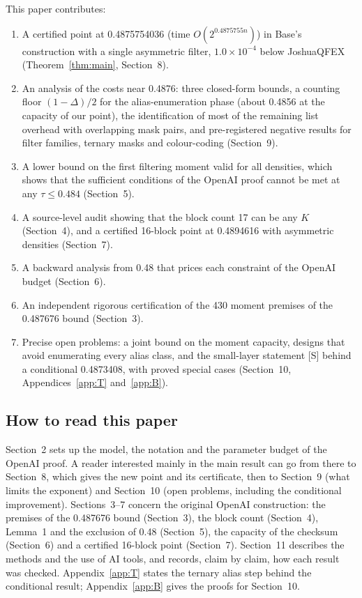 \documentclass[11pt]{article}
\theoremstyle{plain}
\begin{document}
This paper contributes:

\begin{enumerate}
\item A certified point at 0.4875754036 (time $O(2^{0.4875755n})$) in Base's construction with a single asymmetric filter, $1.0\times10^{-4}$ below JoshuaQFEX (Theorem~\ref{thm:main}, Section~8).
\item An analysis of the costs near 0.4876: three closed-form bounds, a counting floor $(1 - \Delta)/2$ for the alias-enumeration phase (about 0.4856 at the capacity of our point), the identification of most of the remaining list overhead with overlapping mask pairs, and pre-registered negative results for filter families, ternary masks and colour-coding (Section~9).
\item A lower bound on the first filtering moment valid for all densities, which shows that the sufficient conditions of the OpenAI proof cannot be met at any $\tau \le 0.484$ (Section~5).
\item A source-level audit showing that the block count 17 can be any $K$ (Section~4), and a certified 16-block point at 0.4894616 with asymmetric densities (Section~7).
\item A backward analysis from 0.48 that prices each constraint of the OpenAI budget (Section~6).
\item An independent rigorous certification of the 430 moment premises of the 0.487676 bound (Section~3).
\item Precise open problems: a joint bound on the moment capacity, designs that avoid enumerating every alias class, and the small-layer statement [S] behind a conditional 0.4873408, with proved special cases (Section~10, Appendices~\ref{app:T} and~\ref{app:B}).
\end{enumerate}

\subsection*{How to read this paper}
Section~2 sets up the model, the notation and the parameter budget of the OpenAI proof. A reader interested mainly in the main result can go from there to Section~8, which gives the new point and its certificate, then to Section~9 (what limits the exponent) and Section~10 (open problems, including the conditional improvement). Sections~3--7 concern the original OpenAI construction: the premises of the 0.487676 bound (Section~3), the block count (Section~4), Lemma~1 and the exclusion of 0.48 (Section~5), the capacity of the checksum (Section~6) and a certified 16-block point (Section~7). Section~11 describes the methods and the use of AI tools, and records, claim by claim, how each result was checked. Appendix~\ref{app:T} states the ternary alias step behind the conditional result; Appendix~\ref{app:B} gives the proofs for Section~10.
\end{document}
